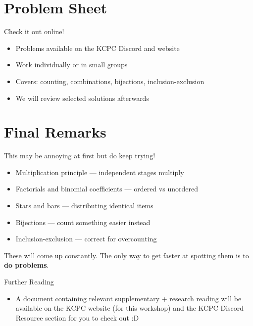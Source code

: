 \documentclass{beamer}
\begin{document}

\section{Problem Sheet}
\begin{frame}
    Check it out online!

    \begin{itemize}
        \item Problems available on the KCPC Discord and website
        \pause
        \item Work individually or in small groups
        \pause
        \item Covers: counting, combinations, bijections, inclusion-exclusion
        \pause
        \item We will review selected solutions afterwards
    \end{itemize}
\end{frame}

\section{Final Remarks}
\begin{frame}
    This may be annoying at first but do keep trying!

    \begin{itemize}
        \item Multiplication principle --- independent stages multiply
        \item Factorials and binomial coefficients --- ordered vs unordered
        \item Stars and bars --- distributing identical items
        \item Bijections --- count something easier instead
        \item Inclusion-exclusion --- correct for overcounting
    \end{itemize}

    \vspace{0.5em}

    These will come up constantly. The only way to get faster at spotting them is to \textbf{do problems}.
\end{frame}

\begin{frame}{Further Reading}

    \begin{itemize}
    
        \item A document containing relevant supplementary + research reading will be available on the KCPC website (for this workshop) and the KCPC Discord Resource section for you to check out :D
    
    \end{itemize}
    
\end{frame}

\end{document}
